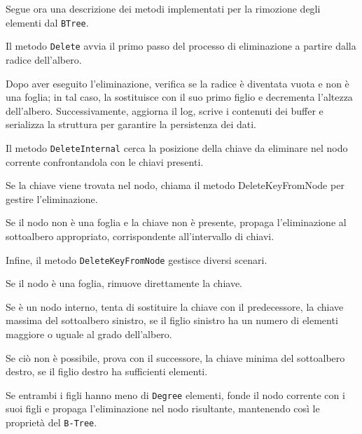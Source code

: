 \documentclass[12pt,a4paper,openright,twoside]{book}
\begin{document}
                    Segue ora una descrizione dei metodi implementati per la rimozione degli elementi dal \texttt{BTree}.

                    Il metodo \texttt{Delete} avvia il primo passo del processo di eliminazione a partire dalla radice dell'albero.

                    Dopo aver eseguito l'eliminazione, verifica se la radice è diventata vuota e non è una foglia; in tal caso, la sostituisce con il suo primo figlio e decrementa l'altezza dell'albero. Successivamente, aggiorna il log, scrive i contenuti dei buffer e serializza la struttura per garantire la persistenza dei dati.

                    

                    Il metodo \texttt{DeleteInternal} cerca la posizione della chiave da eliminare nel nodo corrente confrontandola con le chiavi presenti.

                    Se la chiave viene trovata nel nodo, chiama il metodo DeleteKeyFromNode per gestire l'eliminazione.

                    Se il nodo non è una foglia e la chiave non è presente, propaga l'eliminazione al sottoalbero appropriato, corrispondente all'intervallo di chiavi.

                    

                    \clearpage

                    Infine, il metodo \texttt{DeleteKeyFromNode} gestisce diversi scenari.

                    Se il nodo è una foglia, rimuove direttamente la chiave.

                    Se è un nodo interno, tenta di sostituire la chiave con il predecessore, la chiave massima del sottoalbero sinistro, se il figlio sinistro ha un numero di elementi maggiore o uguale al grado dell'albero.

                    Se ciò non è possibile, prova con il successore, la chiave minima del sottoalbero destro, se il figlio destro ha sufficienti elementi.

                    Se entrambi i figli hanno meno di \texttt{Degree} elementi, fonde il nodo corrente con i suoi figli e propaga l'eliminazione nel nodo risultante, mantenendo così le proprietà del \texttt{B-Tree}.
\end{document}
